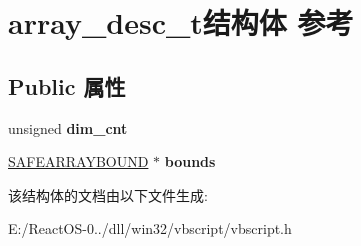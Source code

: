 \hypertarget{structarray__desc__t}{}\section{array\+\_\+desc\+\_\+t结构体 参考}
\label{structarray__desc__t}
\subsection*{Public 属性}
\begin{DoxyCompactItemize}
\item 
\mbox{\label{structarray__desc__t_a05c9c15ca234630c0622c83a3b6b69c9}} 
unsigned {\bfseries dim\+\_\+cnt}
\item 
\mbox{\label{structarray__desc__t_ac0087b0d94314936bd29717cf75aafcc}} 
\hyperlink{structtag_s_a_f_e_a_r_r_a_y_b_o_u_n_d}{S\+A\+F\+E\+A\+R\+R\+A\+Y\+B\+O\+U\+ND} $\ast$ {\bfseries bounds}
\end{DoxyCompactItemize}


该结构体的文档由以下文件生成\+:\begin{DoxyCompactItemize}
\item 
E\+:/\+React\+O\+S-\/0../dll/win32/vbscript/vbscript.\+h\end{DoxyCompactItemize}
